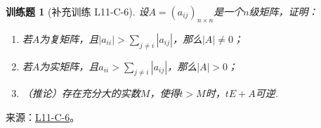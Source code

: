 \documentclass[12pt,fontset=fandol]{ctexart}
\newtheorem{exercise}{训练题}[section]
\begin{document}
\begin{exercise}[补充训练 L11-C-6]\label{prob:L11-C-6}
设$A=(a_{ij})_{n \times n}$是一个$n$级矩阵，证明：
        \begin{enumerate}
            \item 若$A$为复矩阵，且$|a_{ii}|>\displaystyle\sum_{j \neq i}|a_{ij}|$，那么$|A|\neq 0$；

            \item 若$A$为实矩阵，且$a_{ii}>\displaystyle\sum_{j \neq i}|a_{ij}|$，那么$|A|>0$；

            \item （推论）存在充分大的实数$M$，使得$t>M$时，$tE+A$可逆.
        \end{enumerate}
\end{exercise}
\noindent 来源：\href{https://github.com/yhwu-is/Linear-Algebra-Left-Undone/blob/new/%E8%AE%B2%E4%B9%89/%E4%B8%93%E9%A2%98/11%20%E6%9C%9D%E8%8A%B1%E5%A4%95%E6%8B%BE.tex}{L11-C-6}。
\end{document}
